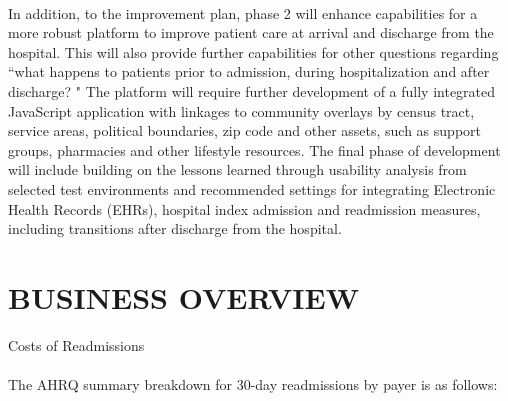 \documentclass[11pt]{article}\usepackage[]{graphicx}\usepackage[]{color}
\begin{document}
\paragraph{}
In addition, to the improvement plan, phase 2 will enhance capabilities for a more robust platform to improve patient care at arrival and discharge from the hospital. This will also provide further capabilities for other questions regarding ``what happens to patients prior to admission, during hospitalization and after discharge? " The platform will require further development of a fully integrated JavaScript application with linkages to community overlays by census tract, service areas, political boundaries, zip code and other assets, such as support groups, pharmacies and other lifestyle resources. The final phase of development will include building on the lessons learned through usability analysis from selected test environments and recommended settings for integrating Electronic Health Records (EHRs), hospital index admission and readmission measures, including transitions after discharge from the hospital.

\section{BUSINESS OVERVIEW}
Costs of Readmissions
\paragraph{}
The AHRQ summary breakdown for 30-day readmissions by payer is as follows:
\end{document}
